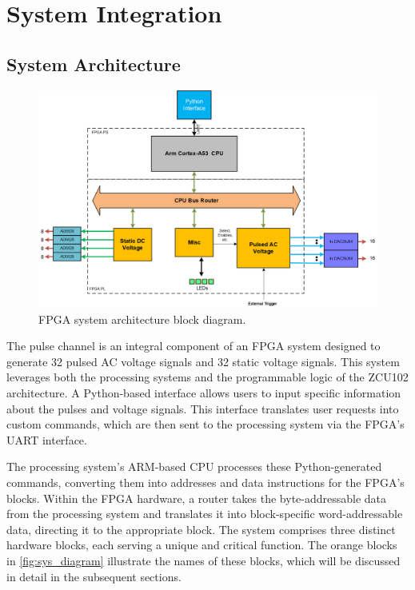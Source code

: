 \chapter{System Integration}

\section{System Architecture}

\begin{figure}[h]
    \centering
    \includegraphics[width=1\linewidth]{figures/5.1.png}
    \caption{FPGA system architecture block diagram.}
    \label{fig:sys_diagram}
\end{figure}

The pulse channel is an integral component of an FPGA system designed to generate 32 pulsed AC voltage signals and 32 static voltage signals. This system leverages both the processing systems and the programmable logic of the ZCU102 architecture. A Python-based interface allows users to input specific information about the pulses and voltage signals. This interface translates user requests into custom commands, which are then sent to the processing system via the FPGA's UART interface.

The processing system's ARM-based CPU processes these Python-generated commands, converting them into addresses and data instructions for the FPGA's blocks. Within the FPGA hardware, a router takes the byte-addressable data from the processing system and translates it into block-specific word-addressable data, directing it to the appropriate block. The system comprises three distinct hardware blocks, each serving a unique and critical function. The orange blocks in \autoref{fig:sys_diagram} illustrate the names of these blocks, which will be discussed in detail in the subsequent sections.

